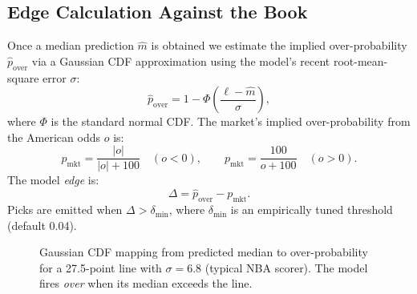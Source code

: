 \documentclass[conference]{IEEEtran}
\begin{document}
\subsection{Edge Calculation Against the Book}

Once a median prediction $\hat{m}$ is obtained we estimate the implied
over-probability $\hat{p}_{\text{over}}$ via a Gaussian CDF approximation
using the model's recent root-mean-square error $\sigma$:
\begin{equation}
  \hat{p}_{\text{over}} = 1 - \Phi\!\left(\frac{\ell - \hat{m}}{\sigma}\right),
\label{eq:cdf}
\end{equation}
where $\Phi$ is the standard normal CDF.  The market's implied over-probability
from the American odds $o$ is:
\begin{equation}
  p_{\text{mkt}} = \frac{|o|}{|o|+100}\quad (o < 0),\qquad
  p_{\text{mkt}} = \frac{100}{o+100}\quad (o > 0).
\label{eq:implied}
\end{equation}
The model \emph{edge} is:
\begin{equation}
  \Delta = \hat{p}_{\text{over}} - p_{\text{mkt}}.
\label{eq:edge}
\end{equation}
Picks are emitted when $\Delta > \delta_{\min}$, where $\delta_{\min}$
is an empirically tuned threshold (default 0.04).

\begin{figure}[!t]
\centering
{}
\caption{Gaussian CDF mapping from predicted median to over-probability
for a 27.5-point line with $\sigma=6.8$ (typical NBA scorer).  The model
fires \emph{over} when its median exceeds the line.}
\label{fig:cdf}
\end{figure}
\end{document}
